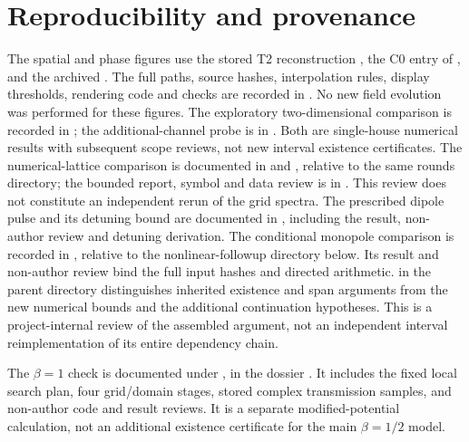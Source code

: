 \documentclass[a4paper,11pt]{article}
\begin{document}
\section{Reproducibility and provenance}\label{app:provenance}
The spatial and phase figures use the stored T2 reconstruction
, the C0 entry of
, and the archived
.
The full paths, source hashes, interpolation rules, display thresholds,
rendering code and checks are recorded in
.
No new field evolution was performed for these figures.
The exploratory two-dimensional comparison is recorded in
; the additional-channel
probe is in .
Both are single-house numerical results with subsequent scope reviews,
not new interval existence certificates. The numerical-lattice comparison
is documented in  and
, relative to the same rounds directory;
the bounded report, symbol and data review is in
.
This review does not constitute an independent rerun of the grid spectra.
The prescribed dipole pulse and
its detuning bound are documented in
,
including the result, non-author review and detuning derivation.
The conditional monopole comparison is recorded in
,
relative to the nonlinear-followup directory below. Its result and
non-author review bind the full input hashes and directed arithmetic.
 in the parent directory distinguishes
inherited existence and span arguments from the new numerical bounds
and the additional continuation hypotheses. This is a project-internal
review of the assembled argument, not an independent interval
reimplementation of its entire dependency chain.

The $\beta=1$ check is documented under
, in the dossier
. It includes the fixed local search
plan, four grid/domain stages, stored
complex transmission samples, and non-author code and result reviews.
It is a separate modified-potential calculation, not an additional
existence certificate for the main $\beta=1/2$ model.
\end{document}
